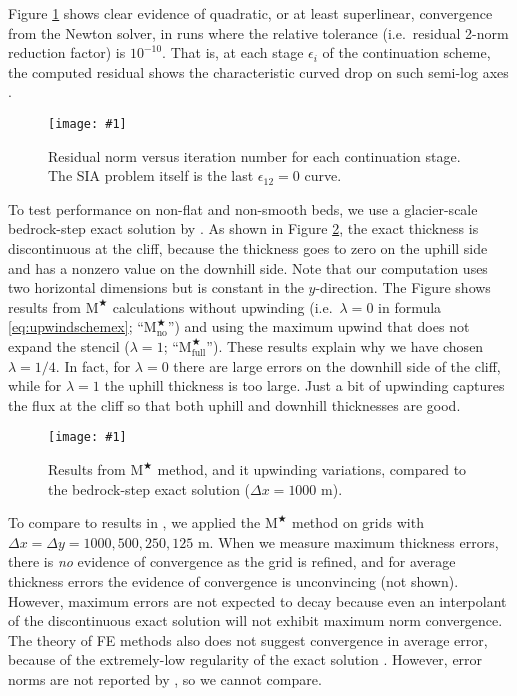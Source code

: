 \documentclass[review,letterpaper]{igs}
\newcommand{\onecol}[1]{\texttt{[image: \#1]}}
\newcommand\eps{\epsilon}
\newcommand{\Mstar}{$\text{M}^{\bigstar}$\xspace}
\newcommand{\Mstarnoup}{$\text{M}^{\bigstar}_{\text{no}}$\xspace}
\newcommand{\Mstarfullup}{$\text{M}^{\bigstar}_{\text{full}}$\xspace}
\begin{document}
Figure \ref{fig:newtonconv} shows clear evidence of quadratic, or at least superlinear, convergence from the Newton solver, in runs where the relative tolerance (i.e.~residual 2-norm reduction factor) is $10^{-10}$.  That is, at each stage $\eps_i$ of the continuation scheme, the computed residual shows the characteristic curved drop on such semi-log axes \citep{Kelley2003}.

\begin{figure}[ht]
\onecol{newtonconv.pdf}
\caption{Residual norm versus iteration number for each continuation stage.  The SIA problem itself is the last $\eps_{12}=0$ curve.}
\label{fig:newtonconv}
\end{figure}

To test performance on non-flat and non-smooth beds, we use a glacier-scale bedrock-step exact solution by \cite{JaroschSchoofAnslow2013}.  As shown in Figure \ref{fig:bedstepprofiles}, the exact thickness is discontinuous at the cliff, because the thickness goes to zero on the uphill side and has a nonzero value on the downhill side.  Note that our computation uses two horizontal dimensions but is constant in the $y$-direction.  The Figure shows results from \Mstar calculations without upwinding (i.e.~$\lambda=0$ in formula \eqref{eq:upwindschemex}; ``\Mstarnoup'') and using the maximum upwind that does not expand the stencil ($\lambda=1$; ``\Mstarfullup'').  These results explain why we have chosen $\lambda=1/4$.  In fact, for $\lambda=0$ there are large errors on the downhill side of the cliff, while for $\lambda=1$ the uphill thickness is too large.  Just a bit of upwinding captures the flux at the cliff so that both uphill and downhill thicknesses are good.

\begin{figure}[ht]
\onecol{bedstepprofiles.pdf}
\caption{Results from \Mstar method, and it upwinding variations, compared to the bedrock-step exact solution ($\Delta x=1000$ m).}
\label{fig:bedstepprofiles}
\end{figure}

To compare to results in \citep{JaroschSchoofAnslow2013}, we applied the \Mstar method on grids with $\Delta x=\Delta y = 1000,500,250,125$ m.  When we measure maximum thickness errors, there is \emph{no} evidence of convergence as the grid is refined, and for average thickness errors the evidence of convergence is unconvincing (not shown).  However, maximum errors are not expected to decay because even an interpolant of the discontinuous exact solution will not exhibit maximum norm convergence.  The theory of FE methods also does not suggest convergence in average error, because of the extremely-low regularity of the exact solution \citep{Elmanetal2005}.  However, error norms are not reported by \cite{JaroschSchoofAnslow2013}, so we cannot compare.
\end{document}
